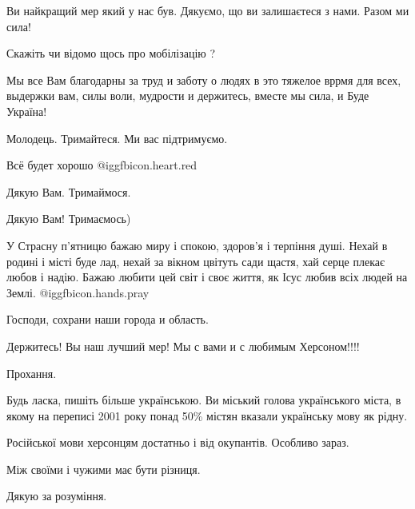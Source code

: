 \begin{itemize}
Ви найкращий мер який у нас був. Дякуємо, що ви залишаєтеся з нами. Разом ми сила!

Скажіть чи відомо щось про мобілізацію ?


Мы все Вам благодарны за труд и заботу о людях в это тяжелое вррмя для всех,
выдержки вам, силы воли, мудрости и держитесь, вместе мы сила, и Буде Україна!

Молодець. Тримайтеся. Ми вас підтримуємо.

Всё будет хорошо @igg{fbicon.heart.red}

Дякую Вам. Тримаймося.

Дякую Вам! Тримаємось)


У Страсну п'ятницю бажаю миру і спокою, здоров'я і терпіння душі. Нехай в
родині і місті буде лад, нехай за вікном цвітуть сади щастя, хай серце плекає
любов і надію. Бажаю любити цей світ і своє життя, як Ісус любив всіх людей на
Землі. @igg{fbicon.hands.pray} 

Господи, сохрани наши города и область.

Держитесь! Вы наш лучший мер! Мы с вами и с любимым Херсоном!!!!


Прохання.

Будь ласка, пишіть більше українською. Ви міський голова українського міста, в
якому на переписі 2001 року понад 50\% містян вказали українську мову як рідну.

Російської мови херсонцям достатньо і від окупантів. Особливо зараз.

Між своїми і чужими має бути різниця.

Дякую за розуміння.

\end{itemize} %



